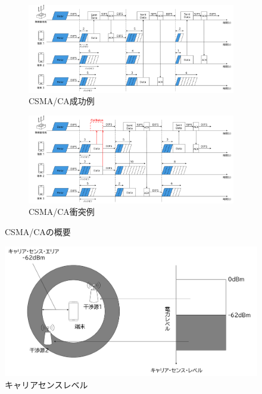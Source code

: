 \documentclass[a4paper,10pt]{ltjsarticle}
\begin{document}
\begin{figure}[H]
  \centering

  \begin{subfigure}{\textwidth}
    \centering
    \includegraphics[width=1\textwidth]{./assets/csma-ca-s.png}
    \caption{CSMA/CA成功例}
    \label{1a}
  \end{subfigure}


  \begin{subfigure}{\textwidth}
    \centering
    \includegraphics[width=1\textwidth]{./assets/csma-ca-f.png}
    \caption{CSMA/CA衝突例}
    \label{1b}
  \end{subfigure}


  \caption{CSMA/CAの概要}
  \label{CSMA/CA}
\end{figure}


\begin{figure}[H]
  \centering
  \includegraphics[width=\textwidth]{./assets/CS_level.png}
  \caption{キャリアセンスレベル}
  \label{fig:CS_level}
\end{figure}
\end{document}
